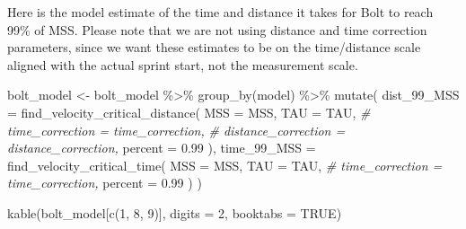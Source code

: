 \documentclass[fleqn,10pt,lineno]{wlpeerj} %
\newenvironment{Shaded}{\begin{snugshade}}{\end{snugshade}}
\newcommand{\AttributeTok}[1]{\textcolor[rgb]{0.77,0.63,0.00}{#1}}
\newcommand{\CommentTok}[1]{\textcolor[rgb]{0.56,0.35,0.01}{\textit{#1}}}
\newcommand{\ConstantTok}[1]{\textcolor[rgb]{0.00,0.00,0.00}{#1}}
\newcommand{\DecValTok}[1]{\textcolor[rgb]{0.00,0.00,0.81}{#1}}
\newcommand{\FloatTok}[1]{\textcolor[rgb]{0.00,0.00,0.81}{#1}}
\newcommand{\FunctionTok}[1]{\textcolor[rgb]{0.00,0.00,0.00}{#1}}
\newcommand{\NormalTok}[1]{#1}
\newcommand{\OtherTok}[1]{\textcolor[rgb]{0.56,0.35,0.01}{#1}}
\newcommand{\SpecialCharTok}[1]{\textcolor[rgb]{0.00,0.00,0.00}{#1}}
\begin{document}
\begin{table}[!h]
\centering
{}
\end{table}

Here is the model estimate of the time and distance it takes for Bolt to reach 99\% of MSS. Please note that we are not using distance and time correction parameters, since we want these estimates to be on the time/distance scale aligned with the actual sprint start, not the measurement scale.

\begin{Shaded}
\begin{Highlighting}[]
\NormalTok{bolt\_model }\OtherTok{\textless{}{-}}\NormalTok{ bolt\_model }\SpecialCharTok{\%\textgreater{}\%}
  \FunctionTok{group\_by}\NormalTok{(model) }\SpecialCharTok{\%\textgreater{}\%}
  \FunctionTok{mutate}\NormalTok{(}
    \AttributeTok{dist\_99\_MSS =} \FunctionTok{find\_velocity\_critical\_distance}\NormalTok{(}
      \AttributeTok{MSS =}\NormalTok{ MSS, }\AttributeTok{TAU =}\NormalTok{ TAU,}
      \CommentTok{\# time\_correction = time\_correction,}
      \CommentTok{\# distance\_correction = distance\_correction,}
      \AttributeTok{percent =} \FloatTok{0.99}
\NormalTok{    ),}
    \AttributeTok{time\_99\_MSS =} \FunctionTok{find\_velocity\_critical\_time}\NormalTok{(}
      \AttributeTok{MSS =}\NormalTok{ MSS, }\AttributeTok{TAU =}\NormalTok{ TAU,}
      \CommentTok{\# time\_correction = time\_correction,}
      \AttributeTok{percent =} \FloatTok{0.99}
\NormalTok{    )}
\NormalTok{  )}

\FunctionTok{kable}\NormalTok{(bolt\_model[}\FunctionTok{c}\NormalTok{(}\DecValTok{1}\NormalTok{, }\DecValTok{8}\NormalTok{, }\DecValTok{9}\NormalTok{)], }\AttributeTok{digits =} \DecValTok{2}\NormalTok{, }\AttributeTok{booktabs =} \ConstantTok{TRUE}\NormalTok{)}
\end{Highlighting}
\end{Shaded}
\end{document}
